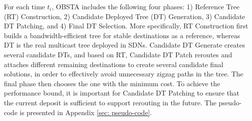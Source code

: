 \documentclass[10pt, conference, letterpaper]{IEEEtran}
\theoremstyle{definition}
\begin{document}
For each time $t_i$, OBSTA includes the following four phases:
1) Reference Tree (RT) Construction, 2) Candidate Deployed Tree (DT) Generation, 3) Candidate DT Patching, and 4) Final DT Selection. More specifically, RT Construction first builds a bandwidth-efficient tree for stable destinations as a reference, whereas DT is the real multicast tree deployed in SDNs. Candidate DT Generate creates several candidate DTs, and based on RT, Candidate DT Patch reroutes and attaches different remaining destinations to create several candidate final solutions, in order to effectively avoid unnecessary zigzag paths in the tree. The final phase then chooses the one with the minimum cost. To achieve the performance bound, it is important for Candidate DT Patching to ensure that the current deposit is sufficient to support rerouting in the future. 
The pseudo-code is presented in Appendix \ref{sec: pseudo-code}.


\end{document}

